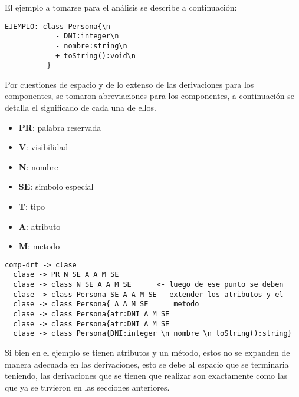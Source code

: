 El ejemplo a tomarse para el análisis se describe a continuación:

\begin{lstlisting}
EJEMPLO: class Persona{\n
            - DNI:integer\n
            - nombre:string\n
            + toString():void\n
          }
\end{lstlisting}

Por cuestiones de espacio y de lo extenso de las derivaciones para los
componentes, se tomaron abreviaciones para los componentes, a continuación
se detalla el significado de cada una de ellos.

\begin{itemize}
  \item \textbf{PR}: palabra reservada
  \item \textbf{V}: visibilidad
  \item \textbf{N}: nombre
  \item \textbf{SE}: simbolo especial
  \item \textbf{T}: tipo
  \item \textbf{A}: atributo
  \item \textbf{M}: metodo
\end{itemize}

\begin{lstlisting}[basicstyle=\ttfamily\footnotesize]
  comp-drt -> clase
  clase -> PR N SE A A M SE
  clase -> class N SE A A M SE      <- luego de ese punto se deben
  clase -> class Persona SE A A M SE   extender los atributos y el
  clase -> class Persona{ A A M SE      metodo
  clase -> class Persona{atr:DNI A M SE
  clase -> class Persona{atr:DNI A M SE
  clase -> class Persona{DNI:integer \n nombre \n toString():string}
\end{lstlisting}

Si bien en el ejemplo se tienen atributos y un método, estos no se expanden de
manera adecuada en las derivaciones, esto se debe al espacio que se terminaria
teniendo, las derivaciones que se tienen que realizar son exactamente como las
que ya se tuvieron en las secciones anteriores.

